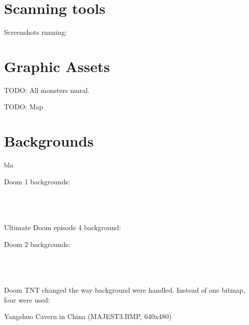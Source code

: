 \section{Scanning tools}
\par
Screenshots running:\\
\par


\section{Graphic Assets}
TODO: All monsters mural.
\par
TODO: Map
\par
{}
\par
{}

\par
\section{Backgrounds}
bla

Doom 1 backgrounds:\\
\par
{}\\
\\
\\

Ultimate Doom episode 4 background:\\
\par
{}

Doom 2 backgrounds:\\
\par
\par
{}\\
\\
\\

Doom TNT changed the way background were handled. Instead of one bitmap, four were used:\\



\begin{minipage}{\textwidth}
\par
Yangshuo Cavern in China (MAJEST3.BMP, 640x480)\\
\par
{}
\end{minipage}
\par


